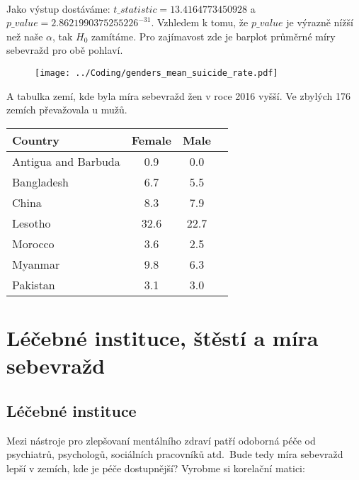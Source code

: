 \documentclass[12pt]{article}
\begin{document}
\paragraph{}
Jako výstup dostáváme: $t\_statistic = 13.4164773450928$ a $p\_value = 2.8621990375255226^{-31}$. Vzhledem k tomu, že $p\_value$ je výrazně nížší než naše $\alpha$, tak $H_0$ zamítáme. Pro zajímavost zde je barplot průměrné míry sebevražd pro obě pohlaví. 
\begin{figure}[hbt]
  \centering
  \texttt{[image: ../Coding/genders\_mean\_suicide\_rate.pdf]}
  \label{fig:plot}
\end{figure}

\newpage
A tabulka zemí, kde byla míra sebevražd žen v roce 2016 vyšší. Ve zbylých 176 zemích převažovala u mužů.
\begin{table}[htb]
\centering
\label{tab:suicide-rates}
\begin{tabular}{lccc}
\hline
Country & Female & Male \\
\hline
Antigua and Barbuda & 0.9 & 0.0 \\
Bangladesh & 6.7 & 5.5 \\
China & 8.3 & 7.9 \\
Lesotho & 32.6 & 22.7 \\
Morocco & 3.6 & 2.5 \\
Myanmar & 9.8 & 6.3 \\
Pakistan & 3.1 & 3.0 \\
\hline
\end{tabular}
\end{table}

\section{Léčebné instituce, štěstí a míra sebevražd}
\subsection{Léčebné instituce}
	Mezi nástroje pro zlepšovaní mentálního zdraví patří odoborná péče od psychiatrů, psychologů, sociálních pracovníků atd.\ Bude tedy míra sebevražd lepší v zemích, kde je péče dostupnější? Vyrobme si korelační matici: \\
\end{document}
